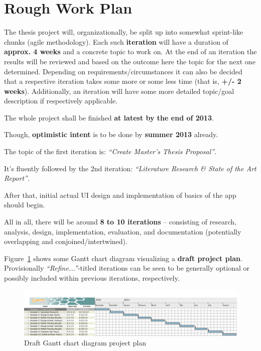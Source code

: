 \section{Rough Work Plan}

The thesis project will, organizationally, be split up into somewhat sprint-like chunks (agile methodology).
Each such \textbf{iteration} will have a duration of \textbf{approx. 4 weeks} and a concrete topic to work on.
At the end of an iteration the results will be reviewed and based on the outcome here the topic for the next one determined. Depending on requirements/circumstances it can also be decided that a respective iteration takes some more or some less time (that is, \textbf{+/- 2 weeks}).
Additionally, an iteration will have some more detailed topic/goal description if respectively applicable.

The whole project shall be finished \textbf{at latest by the end of 2013}.

Though, \textbf{optimistic intent} is to be done by \textbf{summer 2013} already.

The topic of the first iteration is: \textit{``Create Master's Thesis Proposal''}.

It's fluently followed by the 2nd iteration: \textit{``Literature Research \& State of the Art Report''}.

After that, initial actual UI design and implementation of basics of the app should begin.

All in all, there will be around \textbf{8 to 10 iterations} --
consisting of research, analysis, design, implementation, evaluation, and documentation (potentially overlapping and conjoined/intertwined).

Figure~\ref{fig:gantt} shows some Gantt chart diagram visualizing a \textbf{draft project plan}. Provisionally \textit{``Refine...''}-titled iterations can be seen to be generally optional or possibly included within previous iterations, respectively.

\begin{figure}
  \centering
  \includegraphics[width=1.0\textwidth]{figures/gantt-draft-project-plan}
  \caption{Draft Gantt chart diagram project plan}
  \label{fig:gantt}
\end{figure}


